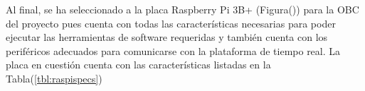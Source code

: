     Al final, se ha seleccionado a la placa Raspberry Pi 3B+ (Figura()) para la OBC del proyecto pues cuenta con todas las características 
    necesarias para poder ejecutar las herramientas de software requeridas y también cuenta con los periféricos adecuados para 
    comunicarse con la plataforma de tiempo real. La placa en cuestión cuenta con las características listadas en la Tabla(\ref{tbl:raspispecs})

    
    \begin{table}[]
        \centering
        \caption{Características de la placa Raspberry Pi 3 model B+. Fuente: \cite{raspi}}
        \label{tbl:raspispecs}
        \end{table}




